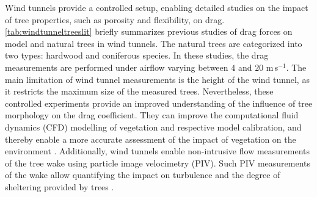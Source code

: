 Wind tunnels provide a controlled setup, enabling detailed studies on the impact of tree properties, such as porosity and flexibility, on drag. \cref{tab:windtunneltreeslit} briefly summarizes previous studies of drag forces on model and natural trees in wind tunnels. The natural trees are categorized into two types: hardwood and coniferous species. In these studies, the drag measurements are performed under airflow varying between $4$ and $20$ m\,s$^{-1}$. The main limitation of wind tunnel measurements is the height of the wind tunnel, as it restricts the maximum size of the measured trees. Nevertheless, these controlled experiments provide an improved understanding of the influence of tree morphology on the drag coefficient. They can improve the computational fluid dynamics (CFD) modelling of vegetation and respective model calibration, and thereby enable a more accurate assessment of the impact of vegetation on the environment \citep{Bitog2011b,Bitog2012b}. Additionally, wind tunnels enable non-intrusive flow measurements of the tree wake using particle image velocimetry (PIV). Such PIV measurements of the wake allow quantifying the impact on turbulence and the degree of sheltering provided by trees \citep{Lee2012,Lee2014565}.

{
}

